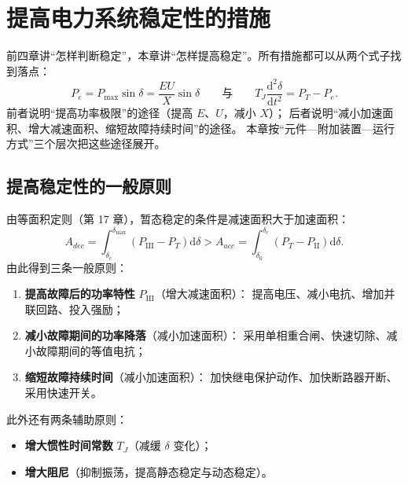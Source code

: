 
\chapter{提高电力系统稳定性的措施}

前四章讲“怎样判断稳定”，本章讲“怎样提高稳定”。所有措施都可以从两个式子找到落点：
\[
  P_e=P_{\max}\sin\delta=\frac{EU}{X}\sin\delta
  \qquad\text{与}\qquad
  T_J\frac{\mathrm{d}^{2}\delta}{\mathrm{d}t^{2}}=P_T-P_e .
\]
前者说明“提高功率极限”的途径（提高 $E$、$U$，减小 $X$）；
后者说明“减小加速面积、增大减速面积、缩短故障持续时间”的途径。
本章按“元件—附加装置—运行方式”三个层次把这些途径展开。

\section{提高稳定性的一般原则}

由等面积定则（第 17 章），暂态稳定的条件是减速面积大于加速面积：
\begin{equation}
  A_{dec}=\int_{\delta_c}^{\delta_{\max}}\left(P_{\text{III}}-P_T\right)\mathrm{d}\delta
  >A_{acc}=\int_{\delta_0}^{\delta_c}\left(P_T-P_{\text{II}}\right)\mathrm{d}\delta .
\end{equation}
由此得到三条一般原则：
\begin{enumerate}
  \item \textbf{提高故障后的功率特性} $P_{\text{III}}$（增大减速面积）：
        提高电压、减小电抗、增加并联回路、投入强励；
  \item \textbf{减小故障期间的功率降落}（减小加速面积）：
        采用单相重合闸、快速切除、减小故障期间的等值电抗；
  \item \textbf{缩短故障持续时间}（减小加速面积）：
        加快继电保护动作、加快断路器开断、采用快速开关。
\end{enumerate}
此外还有两条辅助原则：
\begin{itemize}
  \item \textbf{增大惯性时间常数} $T_J$（减缓 $\delta$ 变化）；
  \item \textbf{增大阻尼}（抑制振荡，提高静态稳定与动态稳定）。
\end{itemize}

